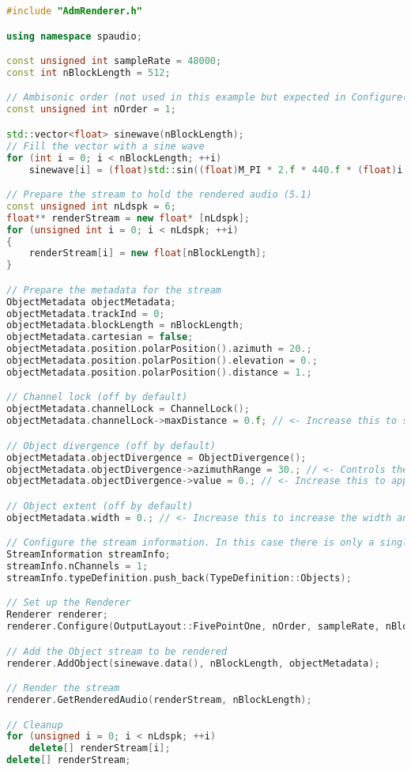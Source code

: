 \documentclass[12pt]{report}
\begin{document}
\begin{lstlisting}[language=C++]
#include "AdmRenderer.h"

using namespace spaudio;

const unsigned int sampleRate = 48000;
const int nBlockLength = 512;

// Ambisonic order (not used in this example but expected in Configure())
const unsigned int nOrder = 1;

std::vector<float> sinewave(nBlockLength);
// Fill the vector with a sine wave
for (int i = 0; i < nBlockLength; ++i)
    sinewave[i] = (float)std::sin((float)M_PI * 2.f * 440.f * (float)i / (float)sampleRate);

// Prepare the stream to hold the rendered audio (5.1)
const unsigned int nLdspk = 6;
float** renderStream = new float* [nLdspk];
for (unsigned int i = 0; i < nLdspk; ++i)
{
    renderStream[i] = new float[nBlockLength];
}

// Prepare the metadata for the stream
ObjectMetadata objectMetadata;
objectMetadata.trackInd = 0;
objectMetadata.blockLength = nBlockLength;
objectMetadata.cartesian = false;
objectMetadata.position.polarPosition().azimuth = 20.;
objectMetadata.position.polarPosition().elevation = 0.;
objectMetadata.position.polarPosition().distance = 1.;

// Channel lock (off by default)
objectMetadata.channelLock = ChannelLock();
objectMetadata.channelLock->maxDistance = 0.f; // <- Increase this to see the signal snap to fully in the left loudspeaker

// Object divergence (off by default)
objectMetadata.objectDivergence = ObjectDivergence();
objectMetadata.objectDivergence->azimuthRange = 30.; // <- Controls the width of the divergence
objectMetadata.objectDivergence->value = 0.; // <- Increase this to apply object divergence

// Object extent (off by default)
objectMetadata.width = 0.; // <- Increase this to increase the width and spread the Object over more adjacent loudspeakers

// Configure the stream information. In this case there is only a single channel stream
StreamInformation streamInfo;
streamInfo.nChannels = 1;
streamInfo.typeDefinition.push_back(TypeDefinition::Objects);

// Set up the Renderer
Renderer renderer;
renderer.Configure(OutputLayout::FivePointOne, nOrder, sampleRate, nBlockLength, streamInfo);

// Add the Object stream to be rendered
renderer.AddObject(sinewave.data(), nBlockLength, objectMetadata);

// Render the stream
renderer.GetRenderedAudio(renderStream, nBlockLength);

// Cleanup
for (unsigned i = 0; i < nLdspk; ++i)
    delete[] renderStream[i];
delete[] renderStream;
\end{lstlisting}
\end{document}
